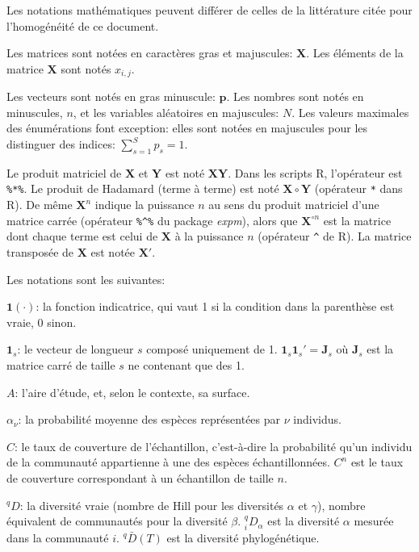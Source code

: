 \documentclass[
  11pt,
  french,
  a4paper,
  extrafontsizes,onecolumn,openright
  ]{memoir}
\begin{document}
Les notations mathématiques peuvent différer de celles de la littérature citée pour l'homogénéité de ce document.

Les matrices sont notées en caractères gras et majuscules: \(\mathbf{X}\).
Les éléments de la matrice \(\mathbf{X}\) sont notés \(x_{i,j}\).

Les vecteurs sont notés en gras minuscule: \(\mathbf{p}\).
Les nombres sont notés en minuscules, \(n\), et les variables aléatoires en majuscules: \(N\).
Les valeurs maximales des énumérations font exception: elles sont notées en majuscules pour les distinguer des indices: \(\sum_{s=1}^{S}{p_s}=1\).

Le produit matriciel de \(\mathbf{X}\) et \(\mathbf{Y}\) est noté \(\mathbf{X}\mathbf{Y}\). Dans les scripts R, l'opérateur est \texttt{\%*\%}.
Le produit de Hadamard (terme à terme) est noté \(\mathbf{X}\circ\mathbf{Y}\) (opérateur \texttt{*} dans R).
De même \(\mathbf{X}^n\) indique la puissance \(n\) au sens du produit matriciel d'une matrice carrée (opérateur \texttt{\%\^{}\%} du package \emph{expm}), alors que \(\mathbf{X}^{\circ n}\) est la matrice dont chaque terme est celui de \(\mathbf{X}\) à la puissance \(n\) (opérateur \texttt{\^{}} de R).
La matrice transposée de \(\mathbf{X}\) est notée \(\mathbf{X'}\).

Les notations sont les suivantes:

\noindent \({\mathbf 1}(\cdot)\): la fonction indicatrice, qui vaut 1 si la condition dans la parenthèse est vraie, 0 sinon.

\noindent \(\mathbf{1}_s\): le vecteur de longueur \(s\) composé uniquement de 1. \(\mathbf{1}_s\mathbf{1}_s'=\mathbf{J}_s\) où \(\mathbf{J}_s\) est la matrice carré de taille \(s\) ne contenant que des 1.

\noindent \(A\): l'aire d'étude, et, selon le contexte, sa surface.

\noindent \(\alpha_\nu\): la probabilité moyenne des espèces représentées par \(\nu\) individus.

\noindent \(C\): le taux de couverture de l'échantillon, c'est-à-dire la probabilité qu'un individu de la communauté appartienne à une des espèces échantillonnées.
\(C^{n}\) est le taux de couverture correspondant à un échantillon de taille \(n\).

\noindent \(^{q}\!D\): la diversité vraie (nombre de Hill pour les diversités \(\alpha\) et \(\gamma\)), nombre équivalent de communautés pour la diversité \(\beta\).
\(^{q}_{i}\!D_{\alpha}\) est la diversité \(\alpha\) mesurée dans la communauté \(i\).
\(^{q}\!\bar{D}\left(T\right)\) est la diversité phylogénétique.
\end{document}

